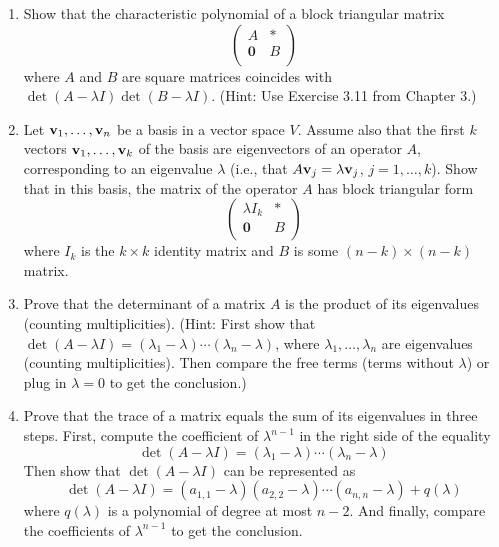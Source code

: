 \documentclass[../psets.tex]{subfiles}
\begin{document}
\begin{enumerate}[label={\textbf{1.\arabic*.}}]
    \item Show that the characteristic polynomial of a block triangular matrix
    \begin{equation*}
        \begin{pmatrix}
            A & *\\
            \bm{0} & B\\
        \end{pmatrix}
    \end{equation*}
    where $A$ and $B$ are square matrices coincides with $\det(A-\lambda I)\det(B-\lambda I)$. (Hint: Use Exercise 3.11 from Chapter 3.)
    \item Let $\mathbf{v}_1,\dots,\mathbf{v}_n$ be a basis in a vector space $V$. Assume also that the first $k$ vectors $\mathbf{v}_1,\dots,\mathbf{v}_k$ of the basis are eigenvectors of an operator $A$, corresponding to an eigenvalue $\lambda$ (i.e., that $A\mathbf{v}_j=\lambda\mathbf{v}_j$, $j=1,\dots,k$). Show that in this basis, the matrix of the operator $A$ has block triangular form
    \begin{equation*}
        \begin{pmatrix}
            \lambda I_k & *\\
            \bm{0} & B\\
        \end{pmatrix}
    \end{equation*}
    where $I_k$ is the $k\times k$ identity matrix and $B$ is some $(n-k)\times(n-k)$ matrix.
    \item Prove that the determinant of a matrix $A$ is the product of its eigenvalues (counting multiplicities). (Hint: First show that $\det(A-\lambda I)=(\lambda_1-\lambda)\cdots(\lambda_n-\lambda)$, where $\lambda_1,\dots,\lambda_n$ are eigenvalues (counting multiplicities). Then compare the free terms (terms without $\lambda$) or plug in $\lambda=0$ to get the conclusion.)
    \item Prove that the trace of a matrix equals the sum of its eigenvalues in three steps. First, compute the coefficient of $\lambda^{n-1}$ in the right side of the equality
    \begin{equation*}
        \det(A-\lambda I) = (\lambda_1-\lambda)\cdots(\lambda_n-\lambda)
    \end{equation*}
    Then show that $\det(A-\lambda I)$ can be represented as
    \begin{equation*}
        \det(A-\lambda I) = (a_{1,1}-\lambda)(a_{2,2}-\lambda)\cdots(a_{n,n}-\lambda)+q(\lambda)
    \end{equation*}
    where $q(\lambda)$ is a polynomial of degree at most $n-2$. And finally, compare the coefficients of $\lambda^{n-1}$ to get the conclusion.
\end{enumerate}
\end{document}
